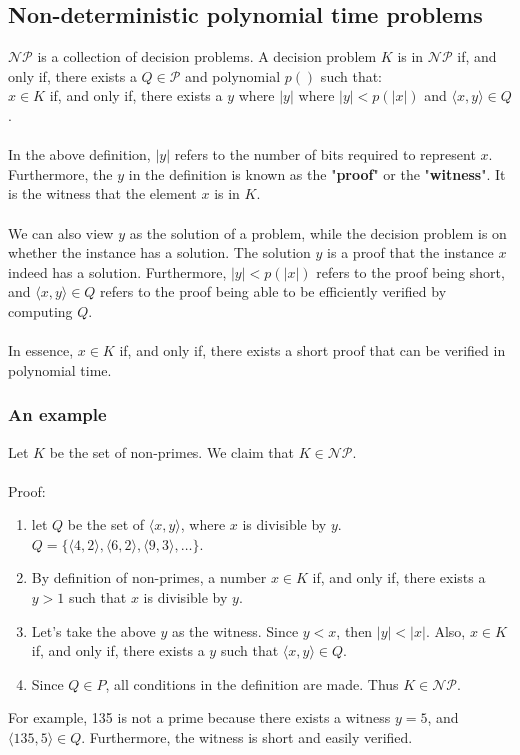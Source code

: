 \documentclass[a4paper]{article}
\begin{document}
\subsection{Non-deterministic polynomial time problems}
$\mathcal{NP}$ is a collection of decision problems. A decision problem $K$ is in $\mathcal{NP}$ if, and only if, there exists a $Q \in \mathcal{P}$ and polynomial $p()$ such that:\\ $x \in K$ if, and only if, there exists a $y$ where $|y|$ where $|y|<p(|x|)$ and $\langle x,y \rangle \in Q$.\\\\
In the above definition, $|y|$ refers to the number of bits required to represent $x$. Furthermore, the $y$ in the definition is known as the "\textbf{proof}" or the "\textbf{witness}". It is the witness that the element $x$ is in $K$.\\\\
We can also view $y$ as the solution of a problem, while the decision problem is on whether the instance has a solution. The solution $y$ is a proof that the instance $x$ indeed has a solution. Furthermore, $|y|<p(|x|)$ refers to the proof being short, and $\langle x,y \rangle \in Q$ refers to the proof being able to be efficiently verified by computing $Q$.\\\\
In essence, $x \in K$ if, and only if, there exists a short proof that can be verified in polynomial time.

\subsubsection{An example}
Let $K$ be the set of non-primes. We claim that $K \in \mathcal{NP}$.\\\\
Proof:
\begin{enumerate}
	\item let $Q$ be the set of $\langle x,y \rangle$, where $x$ is divisible by $y$. $Q = \{\langle 4, 2\rangle, \langle 6, 2\rangle, \langle 9, 3\rangle, \dots\}$.
	\item By definition of non-primes, a number $x \in K$ if, and only if, there exists a $y > 1$ such that $x$ is divisible by $y$.
	\item Let's take the above $y$ as the witness. Since $y<x$, then $|y| < |x|$. Also, $x \in K$ if, and only if, there exists a $y$ such that $\langle x,y \rangle \in Q$.
	\item Since $Q \in P$, all conditions in the definition are made. Thus $K \in \mathcal{NP}$.
\end{enumerate}
For example, 135 is not a prime because there exists a witness $y=5$, and $\langle 135, 5\rangle \in Q$. Furthermore, the witness is short and easily verified.
\end{document}
